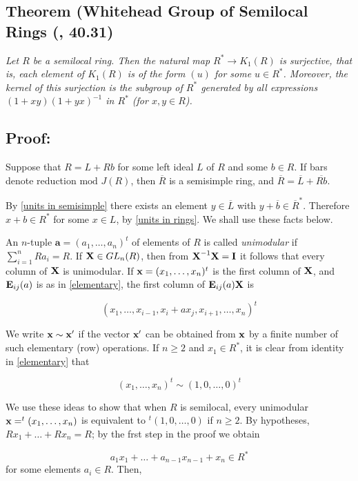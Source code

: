 \subsection{Theorem (Whitehead Group of Semilocal Rings (\cite{CR}, 40.31)\label{whitehead semilocal}}
\emph{Let $R$ be a semilocal ring. Then the natural map $R^* \rightarrow K_1(R)$ is surjective, that is, each element of $K_1(R)$ is of the form $(u)$ for some $u\in R^*$. Moreover, the kernel of this surjection is the subgroup of $R^*$ generated by all expressions $(1+xy)(1+yx)^{-1}$ in $R^*$ (for $x,y \in R$).}

\subsection*{Proof:}

Suppose that $R=L+Rb$ for some left ideal $L$ of $R$ and some $b\in R$. If bars denote reduction $\text{mod } J(R)$, then $\overline R$ is a semisimple ring, and $\overline R = \overline L + \overline{Rb}$. 

By \ref{units in semisimple} there exists an element $y\in \overline L$ with $y+\overline b \in \overline R^*$. Therefore $x+b\in R^*$ for some $x\in L$, by \ref{units in rings}. We shall use these facts below.

An $n$-tuple $\mathbf a =  (a_1, \dots , a_n)^t$ of elements of $R$ is called \textit{unimodular} if $\sum_{i=1}^n R a_i = R$. If $\textbf X \in GL_n (R)$, then from $\textbf X^{-1} \textbf X = \textbf I$ it follows that every column of $\textbf X$ is unimodular. If $\textbf x = (x_1, \dots , x_n)^t$ is the first column of $\textbf X$, and $\textbf E_{ij} (a)$ is as in \ref{elementary}, the first column of $\textbf E_{ij} (a) \textbf X$ is 

$$(x_1, \dots, x_{i-1}, x_i +ax_j, x_{i+1}, \dots , x_n)^t$$

We write $\textbf x \sim \textbf x'$ if the vector $\textbf x'$ can be obtained from $\textbf x$ by a finite number of such elementary (row) operations. If $n\geq 2$ and $x_1\in R^*$, it is clear from identity in \ref{elementary} that

$$(x_1, \dots , x_n)^t \sim  (1,0, \dots , 0)^t$$

We use these ideas to show that when $R$ is semilocal, every unimodular $\textbf x = ^t(x_1, \dots , x_n)$ is equivalent to $^t(1,0, \dots, 0)$ if $n\geq2$. By hypotheses, $Rx_1+\dots+Rx_n = R$; by the frst step in the proof we obtain 

$$a_1x_1 + \dots + a_{n-1} x_{n-1} +x_n \in R^*$$
for some elements $a_i\in R$. Then,

